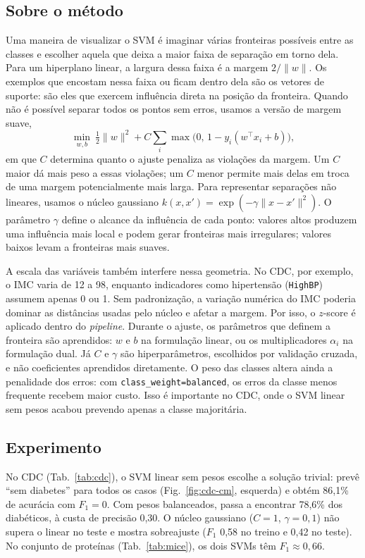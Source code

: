 \documentclass[aps,pre,twocolumn,10pt,nofootinbib]{revtex4-2}
\begin{document}
\subsection{Sobre o método}
Uma maneira de visualizar o SVM é imaginar várias fronteiras possíveis
entre as classes e escolher aquela que deixa a maior faixa de separação em
torno dela. Para um hiperplano linear, a largura dessa faixa é a margem
$2/\lVert w\rVert$. Os exemplos que encostam nessa faixa ou ficam dentro
dela são os vetores de suporte: são eles que exercem influência direta na
posição da fronteira. Quando não é possível separar todos os pontos sem
erros, usamos a versão de margem suave,
\begin{equation}
\min_{w,b}\ \tfrac12\lVert w\rVert^2 + C\sum_i \max\bigl(0,\,1 - y_i(w^\top x_i + b)\bigr),
\end{equation}
em que $C$ determina quanto o ajuste penaliza as violações da margem. Um
$C$ maior dá mais peso a essas violações; um $C$ menor permite mais delas
em troca de uma margem potencialmente mais larga. Para representar
separações não lineares, usamos o núcleo gaussiano
$k(x,x') = \exp(-\gamma\lVert x-x'\rVert^2)$. O parâmetro
$\gamma$ define o alcance da influência de cada ponto: valores altos
produzem uma influência mais local e podem gerar fronteiras mais
irregulares; valores baixos levam a fronteiras mais suaves.

A escala das variáveis também interfere nessa geometria. No CDC, por
exemplo, o IMC varia de 12 a 98, enquanto indicadores como hipertensão
(\texttt{HighBP}) assumem apenas 0 ou 1. Sem padronização, a variação
numérica do IMC poderia dominar as distâncias usadas pelo núcleo e afetar
a margem. Por isso, o $z$-score é aplicado dentro do \textit{pipeline}.
Durante o ajuste, os parâmetros que definem a fronteira são aprendidos:
$w$ e $b$ na formulação linear, ou os multiplicadores $\alpha_i$ na
formulação dual. Já $C$ e $\gamma$ são hiperparâmetros, escolhidos por
validação cruzada, e não coeficientes aprendidos diretamente. O peso das
classes altera
ainda a penalidade dos erros: com \texttt{class\_weight=balanced}, os erros
da classe menos frequente recebem maior custo. Isso é importante no CDC,
onde o SVM linear sem pesos acabou prevendo apenas a classe majoritária.

\subsection{Experimento}
No CDC (Tab.~\ref{tab:cdc}), o SVM linear sem pesos escolhe a solução
trivial: prevê ``sem diabetes'' para todos os casos
(Fig.~\ref{fig:cdc-cm}, esquerda) e obtém 86,1\% de acurácia com $F_1 = 0$.
Com pesos balanceados, passa a encontrar 78,6\% dos diabéticos, à custa de
precisão 0,30. O núcleo gaussiano ($C=1$, $\gamma=0{,}1$) não supera o
linear no teste e mostra sobreajuste ($F_1$ 0,58 no treino e 0,42 no
teste). No conjunto de proteínas (Tab.~\ref{tab:mice}), os dois SVMs têm
$F_1 \approx 0{,}66$.
\end{document}
